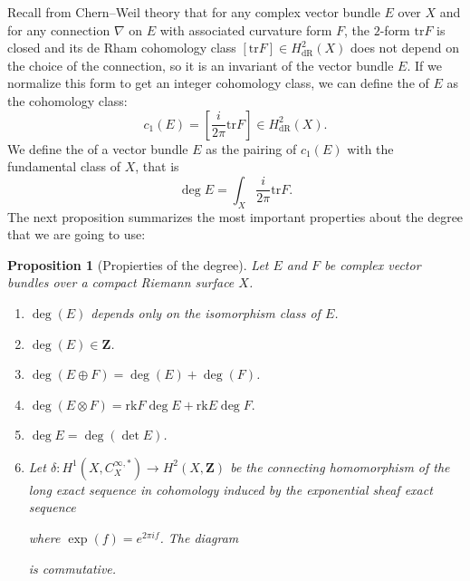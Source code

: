 \documentclass[12pt,a4paper]{book}
\newtheorem{prop}[thm]{Proposition}
\theoremstyle{definition} \newtheorem{defn}[thm]{Definition}
\theoremstyle{definition} \newtheorem{ejemplo}[thm]{Example}
\theoremstyle{remark} \newtheorem{rem}[thm]{Remark}
\def\ZZ{\mathbf{Z}}
\def\tr{\mathrm{tr}}
\def\rk{\mathrm{rk}}
\let\emph\relax
\begin{document}
Recall from Chern--Weil theory \cite{griffithsharris,wells} that for any complex vector bundle $E$ over $X$ and for any connection $\nabla$ on $E$ with associated curvature form $F$, the $2$-form $\tr F$ is closed and its de Rham cohomology class $[\tr F]\in H_{\mathrm{dR}}^2(X)$ does not depend on the choice of the connection, so it is an invariant of the vector bundle $E$. If we normalize this form to get an integer cohomology class, we can define the \emph{first Chern class} of $E$ as the cohomology class:
\begin{equation*}
  c_1(E)=\left[ \frac{i}{2\pi} \tr F \right] \in H_{\mathrm{dR}}^2(X).
\end{equation*}
We define the \emph{degree} of a vector bundle $E$ as the pairing of $c_1(E)$ with the fundamental class of $X$, that is
\begin{equation*}
  \deg E = \int_X\frac{i}{2\pi} \tr F. 
\end{equation*}
The next proposition \cite{wells} summarizes the most important properties about the degree that we are going to use:
\begin{prop}[Propierties of the degree]
  Let $E$ and $F$ be complex vector bundles over a compact Riemann surface $X$.
  \begin{enumerate}
    \item $\deg(E)$ depends only on the isomorphism class of $E$.
    \item $\deg(E) \in \mathbf{Z}$.
    \item $\deg(E\oplus F)=\deg(E)+ \deg(F)$.
    \item $\deg(E\otimes F)=\rk F \deg E + \rk E \deg F.$
    \item $\deg E=\deg(\det E) $.
    \item
      Let $\delta:H^1(X,C^{\infty,*}_X) \rightarrow H^2(X,\ZZ)$ be the connecting homomorphism of the long exact sequence in cohomology induced by the exponential sheaf exact sequence
      \begin{center}
       \end{center}
       where $\exp(f)=e^{2\pi if}$.
      The diagram
      \begin{center}
       \end{center}
       is commutative.
  \end{enumerate}
\end{prop}
\end{document}
